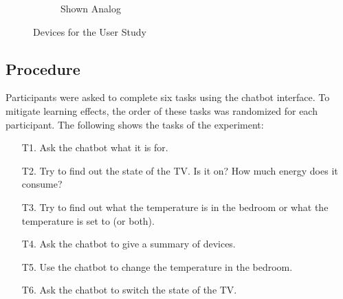 \begin{figure}[h]
\begin{subfigure}{.6\textwidth}
        \caption{Shown Analog}
        \label{fig:devicesrl}
        \end{subfigure}
      \caption{Devices for the User Study}
      \label{fig:devicesstudy}
\end{figure}

\subsection{Procedure}
Participants were asked to complete six tasks using the chatbot interface. To mitigate learning effects, the order of these tasks was randomized for each participant.
The following shows the tasks of the experiment:
\begin{itemize}
    \item[T1.] Ask the chatbot what it is for.
    \item[T2.] Try to find out the state of the TV. Is it on? How much energy does it consume?
    \item[T3.] Try to find out what the temperature is in the bedroom or what the temperature is set to (or both).
    \item[T4.] Ask the chatbot to give a summary of devices.
    \item[T5.] Use the chatbot to change the temperature in the bedroom.
    \item[T6.] Ask the chatbot to switch the state of the TV.
\end{itemize}

